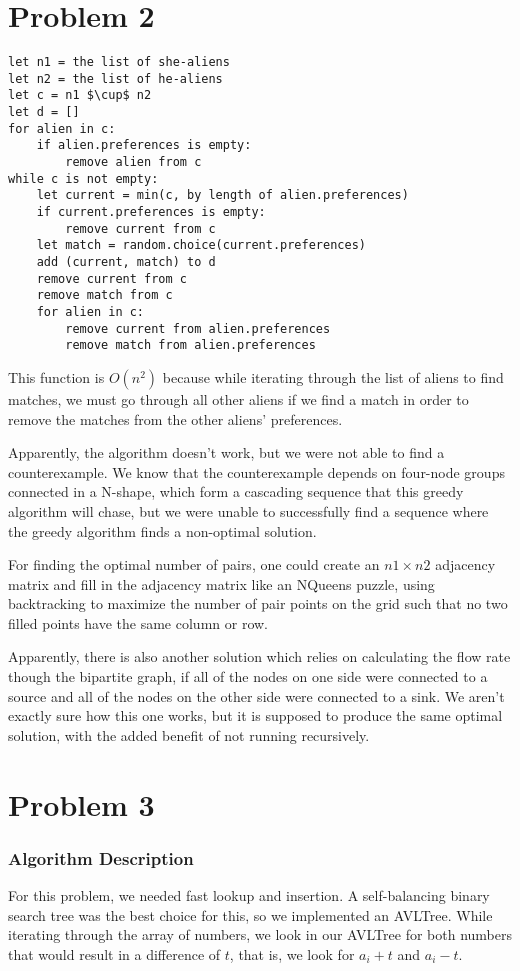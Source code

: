 \documentclass{math}
\begin{document}
\section*{Problem 2}
\begin{lstlisting}[mathescape=true]
let n1 = the list of she-aliens
let n2 = the list of he-aliens
let c = n1 $\cup$ n2
let d = []
for alien in c:
    if alien.preferences is empty:
        remove alien from c
while c is not empty:
    let current = min(c, by length of alien.preferences)
    if current.preferences is empty:
        remove current from c
    let match = random.choice(current.preferences)
    add (current, match) to d
    remove current from c
    remove match from c
    for alien in c:
        remove current from alien.preferences
        remove match from alien.preferences
\end{lstlisting}
This function is \( O(n^2) \) because while iterating through the list of
aliens to find matches, we must go through all other aliens if we find a match
in order to remove the matches from the other aliens' preferences.
\par
Apparently, the algorithm doesn't work, but we were not able to find a
counterexample. We know that the counterexample depends on four-node groups
connected in a N-shape, which form a cascading sequence that this greedy
algorithm will chase, but we were unable to successfully find a sequence
where the greedy algorithm finds a non-optimal solution.
\par
For finding the optimal number of pairs, one could create an \( n1\times n2 \)
adjacency matrix and fill in the adjacency matrix like an NQueens puzzle, using
backtracking to maximize the number of pair points on the grid such that no
two filled points have the same column or row.
\par
Apparently, there is also another solution which relies on calculating the flow
rate though the bipartite graph, if all of the nodes on one side were connected
to a source and all of the nodes on the other side were connected to a sink. We
aren't exactly sure how this one works, but it is supposed to produce the same
optimal solution, with the added benefit of not running recursively.

\section*{Problem 3}

\subsubsection*{Algorithm Description}
For this problem, we needed fast lookup and insertion. A self-balancing binary
search tree was the best choice for this, so we implemented an AVLTree.
While iterating through the array of numbers, we look in our AVLTree for both
numbers that would result in a difference of \( t \), that is, we look for
\( a_i+t \) and \( a_i-t \).
\end{document}

